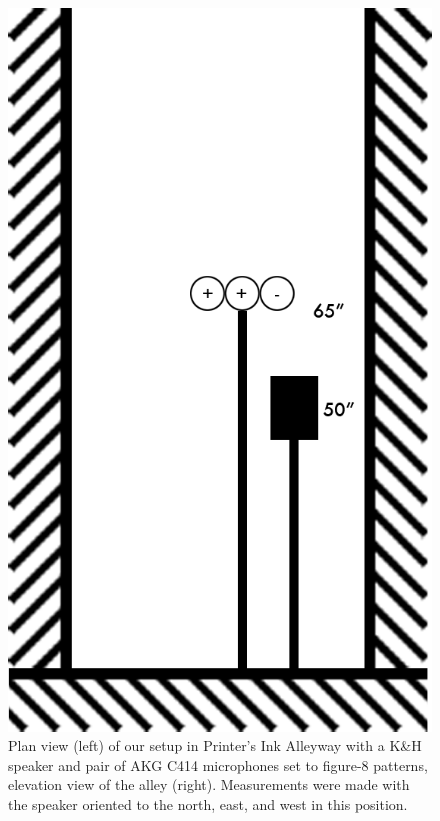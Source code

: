 \documentclass{aes137}
\begin{document}
\begin{figure}[h!]
\begin{minipage}[b]{0.41\linewidth}
\includegraphics[width=\textwidth]{images/alleyway_lookingdown.png}
\end{minipage}
\caption{Plan view (left) of our setup in Printer's Ink Alleyway
  with a K\&H speaker and pair of AKG C414 microphones set to figure-8 patterns,
  elevation view of the alley (right). Measurements were made with the
  speaker oriented to the north, east, and west in this position.}
\end{figure}
\end{document}
